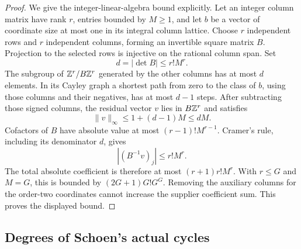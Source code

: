 \documentclass[11pt,a4paper]{article}
\theoremstyle{definition}\newtheorem{definition}[theorem]{Definition}
\theoremstyle{remark}\newtheorem{remark}[theorem]{Remark}
\begin{document}
\begin{proof}
We give the integer-linear-algebra bound explicitly. Let an integer column matrix have rank $r$, entries bounded by $M\ge1$, and let $b$ be a vector of coordinate size at most one in its integral column lattice. Choose $r$ independent rows and $r$ independent columns, forming an invertible square matrix $B$. Projection to the selected rows is injective on the rational column span. Set
\[
 d=|\det B|\le r!M^r.
\]
The subgroup of $\mathbb Z^r/B\mathbb Z^r$ generated by the other columns has at most $d$ elements. In its Cayley graph a shortest path from zero to the class of $b$, using those columns and their negatives, has at most $d-1$ steps. After subtracting those signed columns, the residual vector $v$ lies in $B\mathbb Z^r$ and satisfies
\[
 \|v\|_\infty\le1+(d-1)M\le dM.
\]
Cofactors of $B$ have absolute value at most $(r-1)!M^{r-1}$. Cramer's rule, including its denominator $d$, gives
\[
 |(B^{-1}v)_j|\le r!M^r.
\]
The total absolute coefficient is therefore at most $(r+1)r!M^r$. With $r\le G$ and $M=G$, this is bounded by $(2G+1)G!G^G$. Removing the auxiliary columns for the order-two coordinates cannot increase the supplier coefficient sum. This proves the displayed bound.
\end{proof}

\subsection{Degrees of Schoen's actual cycles}
\end{document}
